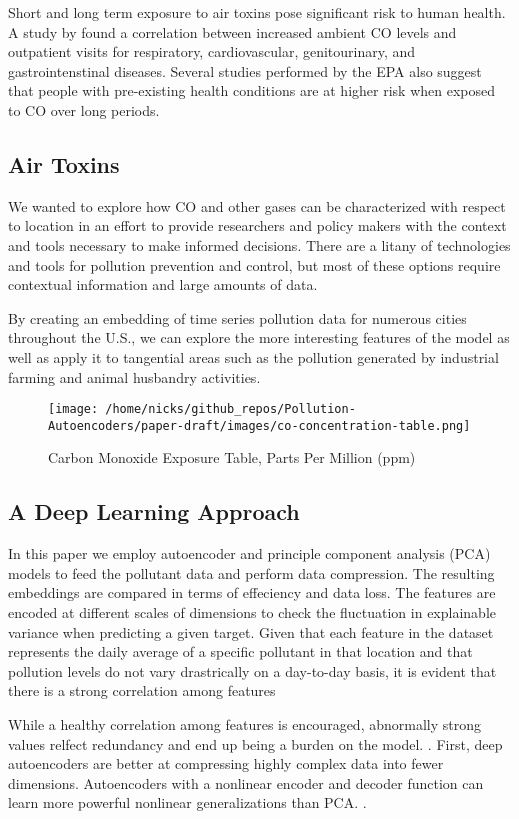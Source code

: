 \documentclass{article}
\begin{document}
Short and long term exposure to air toxins pose significant risk to human health. 
A study by \textcite{Wang19} found a correlation  between increased ambient CO
levels and outpatient visits for respiratory, cardiovascular, genitourinary, and gastrointenstinal
diseases. Several studies performed by the EPA also suggest that people with pre-existing health
conditions are at higher risk when exposed to CO over long periods.\par

\subsection{Air Toxins}
We wanted to explore how CO and other gases can be characterized with respect to location
in an effort to provide researchers and policy makers with the context and tools necessary to
make informed decisions. There are a litany of technologies and tools for pollution prevention
and control, but most of these options require contextual information and large amounts of data.
\par
By creating an embedding of time series pollution data for numerous cities throughout the U.S.,
we can explore the more interesting features of the model as well as apply it to tangential 
areas such as the pollution generated by industrial farming and animal husbandry activities.

\begin{figure}[h]
\texttt{[image: /home/nicks/github\_repos/Pollution-Autoencoders/paper-draft/images/co-concentration-table.png]}
    \caption{Carbon Monoxide Exposure Table, Parts Per Million (ppm)}
    \label{fig:co-exposure}
\end{figure}

\subsection{A Deep Learning Approach}
In this paper we employ autoencoder and  principle component analysis (PCA) models to 
feed the pollutant data and perform data compression. The resulting embeddings are 
compared in terms of effeciency and data loss. The features are encoded at different
scales of dimensions to check the fluctuation in explainable variance when predicting a 
given target. Given that each feature in the dataset represents the daily average of a 
specific pollutant in that location and that pollution levels do not vary drastrically 
on a day-to-day basis, it is evident that there is a strong correlation among features
\par While a healthy correlation among features is encouraged, abnormally strong values
relfect redundancy and end up being a burden on the model.
\parencite{featureredundancy}. First, deep autoencoders are better at compressing highly 
complex data into fewer dimensions. Autoencoders with a nonlinear encoder and decoder 
function can learn more powerful nonlinear generalizations than PCA. 
\parencite{Goodfellow16}.
\end{document}
